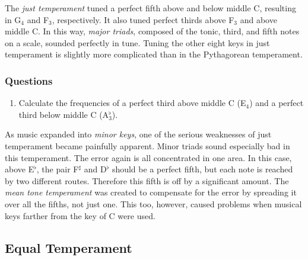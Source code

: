 \documentclass[11pt]{NSF}
\def\ben{\begin{enumerate}}
\def\een{\end{enumerate}}
\begin{document}
The {\em just temperament} tuned a perfect fifth above and below middle C,
resulting in G$_4$ and F$_3$, respectively. 
It also tuned perfect thirds above F$_3$ and above middle C. 
In this way, {\em major triads}, composed of the tonic, third, and 
fifth notes on a scale, sounded perfectly in tune. 
Tuning the other eight keys in just temperament is slightly more
complicated than in the Pythagorean temperament.

\subsubsection*{Questions}
\ben
\item
Calculate the frequencies of a perfect third above middle C (E$_4$) 
and a perfect third below middle C (A$^\flat_3$).
\een

As music expanded into {\em minor keys}, one of the serious weaknesses of
just temperament became painfully apparent. Minor triads sound
especially bad in this temperament. The error again is all
concentrated in one area. In this case, above E$^\flat$, 
the pair F$^\sharp$ and D$^\flat$
should be a perfect fifth, but each note is reached by two different
routes. Therefore this fifth is off by a significant amount. The 
{\em mean tone temperament} was created to compensate for the error by
spreading it over all the fifths, not just one. This too, however, caused
problems when musical keys farther from the key of C were used.

\subsection{Equal Temperament}
\end{document}
